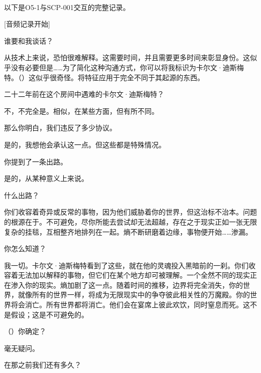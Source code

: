 \newpage

\begin{center}

\hr

\\

\hr

\end{center}

以下是O5-1与SCP-001交互的完整记录。

\begin{greenrecordbox}

{[}音频记录开始]

谁要和我谈话？

从技术上来说，恐怕很难解释。这需要时间，并且需要更多时间来彰显身份。这似乎没有必要但是……为了简化这种沟通方式，你可以将我标识为卡尔文·迪斯梅特。（）这似乎很奇怪。将特征应用于完全不同于其起源的东西。

二十二年前在这个房间中遇难的卡尔文·迪斯梅特？

不，不完全是。相似，在某些方面，但有所不同。

那么你明白，我们违反了多少协议。

是的，我想他会承认这一点。但这些都是特殊情况。

你提到了一条出路。

是的，从某种意义上来说。

什么出路？

你们收容着奇异或反常的事物，因为他们威胁着你的世界，但这治标不治本。问题的根源在于。不可避免，尽你所能去尝试却无法超越，存在之于现实正如一张无限复杂的挂毯，互相整齐地排列在一起。熵不断研磨着边缘，事物便开始……渗漏。

你怎么知道？

我一切。卡尔文·迪斯梅特看到了这些，就在他的灵魂投入黑暗前的一刹。你们收容着无法加以解释的事物，但它们在某个地方却可被理解。一个全然不同的现实正在渗入你的现实。熵加剧了这一点。随着时间的推移，边界将完全消失，你的世界，就像所有的世界一样，将成为无限现实中的争夺彼此相关性的万魔殿。你的世界将会消亡。所有世界都将消亡。他们会在宴席上彼此欢饮，同时窒息而死。这不是假设；这是不可避免的。

（）你确定？

毫无疑问。

在那之前我们还有多久？


\end{greenrecordbox}
